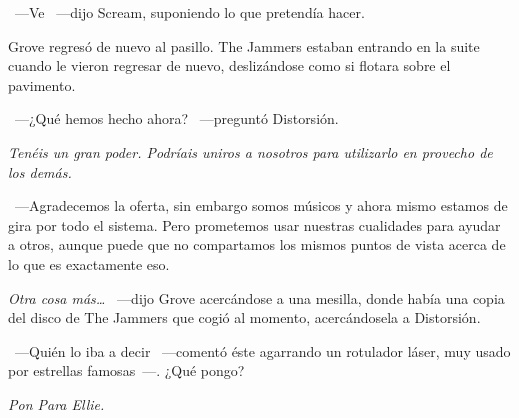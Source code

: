 ~---Ve ~---dijo Scream, suponiendo lo que pretendía hacer.

Grove regresó de nuevo al pasillo. The Jammers estaban entrando en la suite cuando le vieron regresar de nuevo, deslizándose como si flotara sobre el pavimento.

~---¿Qué hemos hecho ahora? ~---preguntó Distorsión.

\emph{Tenéis un gran poder. Podríais uniros a nosotros para utilizarlo en provecho de los demás.}

~---Agradecemos la oferta, sin embargo somos músicos y ahora mismo estamos de gira por todo el sistema. Pero prometemos usar nuestras cualidades para ayudar a otros, aunque puede que no compartamos los mismos puntos de vista acerca de lo que es exactamente eso.

\emph{Otra cosa más\dots} ~---dijo Grove acercándose a una mesilla, donde había una copia del disco de The Jammers que cogió al momento, acercándosela a Distorsión.

~---Quién lo iba a decir ~---comentó éste agarrando un rotulador láser, muy usado por estrellas famosas~---. ¿Qué pongo?

\emph{Pon \emph{Para Ellie}.}
